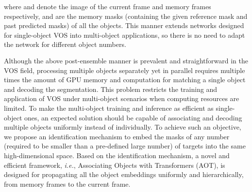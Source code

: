 \documentclass{article}
\def\ie{\emph{i.e.}}
\begin{document}
where  and  denote the image of the current frame and memory frames respectively, and  are the memory masks (containing the given reference mask and past predicted masks) of all the  objects. This manner extends networks designed for single-object VOS into multi-object applications, so there is no need to adapt the network for different object numbers.

Although the above post-ensemble manner is prevalent and straightforward in the VOS field, processing multiple objects separately yet in parallel requires multiple times the amount of GPU memory and computation for matching a single object and decoding the segmentation. This problem restricts the training and application of VOS under multi-object scenarios when computing resources are limited.
To make the multi-object training and inference as efficient as single-object ones, {an expected solution should be capable of associating and decoding multiple objects uniformly instead of individually. To achieve such an objective, we propose an identification mechanism to embed the masks of any number (required to be smaller than a pre-defined large number) of targets into the same high-dimensional space. Based on the identification mechanism, a novel and efficient framework, \ie, Associating Objects with Transformers (AOT), is designed for propagating all the object embeddings uniformly and hierarchically, from memory frames to the current frame.}
\end{document}
